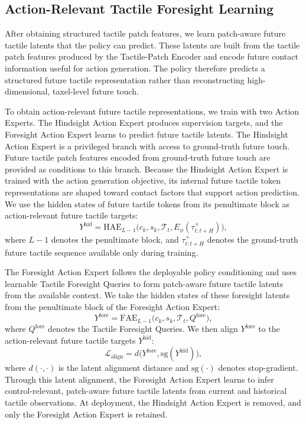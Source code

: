 \subsection{Action-Relevant Tactile Foresight Learning}

After obtaining structured tactile patch features, we learn patch-aware future tactile latents that the policy can predict. These latents are built from the tactile patch features produced by the Tactile-Patch Encoder and encode future contact information useful for action generation. The policy therefore predicts a structured future tactile representation rather than reconstructing high-dimensional, taxel-level future touch.

To obtain action-relevant future tactile representations, we train with two Action Experts. The Hindsight Action Expert produces supervision targets, and the Foresight Action Expert learns to predict future tactile latents. The Hindsight Action Expert is a privileged branch with access to ground-truth future touch. Future tactile patch features encoded from ground-truth future touch are provided as conditions to this branch. Because the Hindsight Action Expert is trained with the action generation objective, its internal future tactile token representations are shaped toward contact factors that support action prediction. We use the hidden states of future tactile tokens from its penultimate block as action-relevant future tactile targets:
\begin{equation}
    Y^{\mathrm{hid}}
    =
    \mathrm{HAE}_{L-1}
    \big(c_k, s_k, \mathcal{T}_t, E_{\phi}(\tau_{t:t+H}^{+})\big),
\end{equation}
where \(L-1\) denotes the penultimate block, and \(\tau_{t:t+H}^{+}\) denotes the ground-truth future tactile sequence available only during training.

The Foresight Action Expert follows the deployable policy conditioning and uses learnable Tactile Foresight Queries to form patch-aware future tactile latents from the available context. We take the hidden states of these foresight latents from the penultimate block of the Foresight Action Expert:
\begin{equation}
    Y^{\mathrm{fore}}
    =
    \mathrm{FAE}_{L-1}
    \big(c_k, s_k, \mathcal{T}_t, Q^{\mathrm{fore}}\big),
\end{equation}
where \(Q^{\mathrm{fore}}\) denotes the Tactile Foresight Queries. We then align \(Y^{\mathrm{fore}}\) to the action-relevant future tactile targets \(Y^{\mathrm{hid}}\):
\begin{equation}
    \mathcal{L}_{\mathrm{align}}
    =
    d\big(Y^{\mathrm{fore}}, \mathrm{sg}(Y^{\mathrm{hid}})\big),
\end{equation}
where \(d(\cdot,\cdot)\) is the latent alignment distance and \(\mathrm{sg}(\cdot)\) denotes stop-gradient. Through this latent alignment, the Foresight Action Expert learns to infer control-relevant, patch-aware future tactile latents from current and historical tactile observations. At deployment, the Hindsight Action Expert is removed, and only the Foresight Action Expert is retained.

